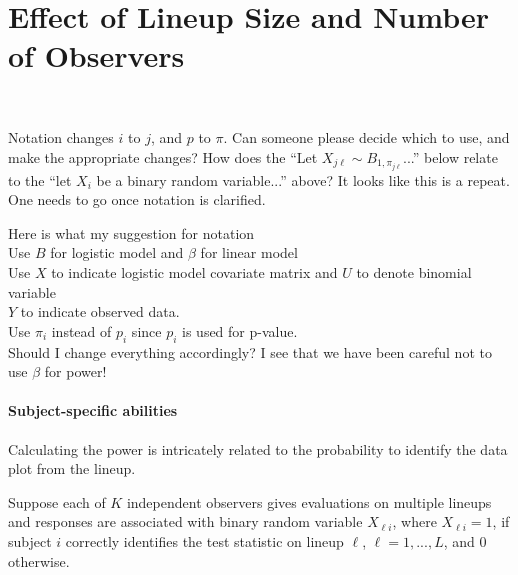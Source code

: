 \documentclass{article}
\newcommand{\red}[1]{{\color{red} #1}}
\newcommand{\green}[1]{{\color{green} #1}} %
\begin{document}
\section{Effect of Lineup Size and Number of Observers}~\label{sec:size}

\green{Notation changes $i$ to $j$, and $p$ to $\pi$. Can someone please decide which to use, and make the appropriate changes? How does the ``Let $X_{j\ell} \sim B_{1, \pi_{j\ell}}$...'' below relate to the ``let $X_i$ be a binary random variable...'' above? It looks like this is a repeat. One needs to go once notation is clarified.}

\red{Here is what my suggestion for notation \\  Use $B$ for logistic model and $\beta$ for linear model \\ Use $X$ to indicate logistic model covariate matrix and $U$ to denote binomial variable \\ $Y$ to indicate observed data. \\ Use $\pi_i$ instead of $p_i$ since $p_i$ is used for p-value.  \\ Should I change everything accordingly? I see that we have been careful not to use $\beta$ for power! }

\paragraph{Subject-specific abilities}
Calculating the power  is intricately related to the probability to identify the data plot from the lineup. 

Suppose each of $K$ independent observers gives evaluations on multiple lineups and responses are associated with binary random variable $X_{\ell i}$, where  $X_{\ell i} = 1$, if subject $i$ correctly identifies the test statistic on lineup $\ell$,  $\ell = 1, ..., L$, and 0 otherwise.
\end{document}
